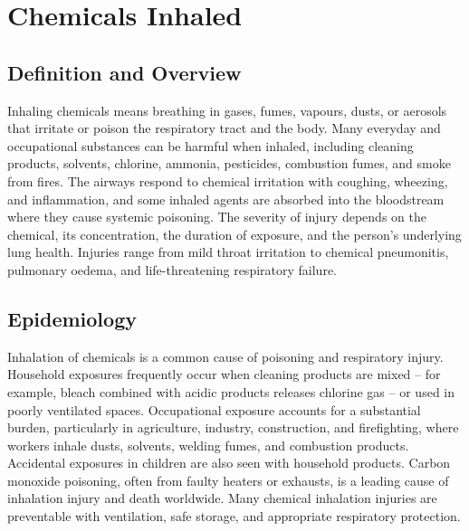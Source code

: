 \chapter{Chemicals Inhaled}

\section*{Definition and Overview}
Inhaling chemicals means breathing in gases, fumes, vapours, dusts, or aerosols that irritate or poison the respiratory tract and the body. Many everyday and occupational substances can be harmful when inhaled, including cleaning products, solvents, chlorine, ammonia, pesticides, combustion fumes, and smoke from fires. The airways respond to chemical irritation with coughing, wheezing, and inflammation, and some inhaled agents are absorbed into the bloodstream where they cause systemic poisoning. The severity of injury depends on the chemical, its concentration, the duration of exposure, and the person's underlying lung health. Injuries range from mild throat irritation to chemical pneumonitis, pulmonary oedema, and life-threatening respiratory failure.

\section*{Epidemiology}
Inhalation of chemicals is a common cause of poisoning and respiratory injury. Household exposures frequently occur when cleaning products are mixed -- for example, bleach combined with acidic products releases chlorine gas -- or used in poorly ventilated spaces. Occupational exposure accounts for a substantial burden, particularly in agriculture, industry, construction, and firefighting, where workers inhale dusts, solvents, welding fumes, and combustion products. Accidental exposures in children are also seen with household products. Carbon monoxide poisoning, often from faulty heaters or exhausts, is a leading cause of inhalation injury and death worldwide. Many chemical inhalation injuries are preventable with ventilation, safe storage, and appropriate respiratory protection.

